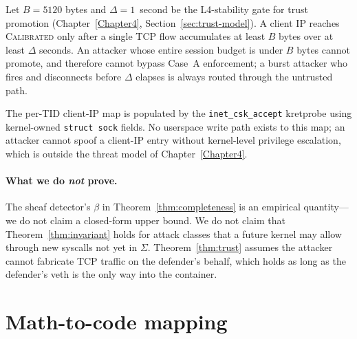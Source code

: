 \begin{theorem}\label{thm:trust}
Let $B = 5120$ bytes and $\Delta = 1$~second be the L4-stability gate for
trust promotion (Chapter~\ref{Chapter4}, Section~\ref{sec:trust-model}). A
client IP reaches \textsc{Calibrated} only after a single TCP flow
accumulates at least $B$ bytes over at least $\Delta$ seconds. An attacker
whose entire session budget is under $B$ bytes cannot promote, and
therefore cannot bypass Case~A enforcement; a burst attacker who fires and
disconnects before $\Delta$ elapses is always routed through the
untrusted path.
\end{theorem}

\begin{remark}\label{rem:attribution}
The per-TID client-IP map is populated by the \texttt{inet\_csk\_accept}
kretprobe using kernel-owned \texttt{struct sock} fields. No userspace
write path exists to this map; an attacker cannot spoof a client-IP entry
without kernel-level privilege escalation, which is outside the threat
model of Chapter~\ref{Chapter4}.
\end{remark}

\paragraph{What we do \emph{not} prove.}  The sheaf detector's
$\beta$ in Theorem~\ref{thm:completeness} is an empirical quantity---we do
not claim a closed-form upper bound. We do not claim that
Theorem~\ref{thm:invariant} holds for attack classes that a future kernel
may allow through new syscalls not yet in $\Sigma$. Theorem~\ref{thm:trust}
assumes the attacker cannot fabricate TCP traffic on the defender's behalf,
which holds as long as the defender's veth is the only way into the
container.

\section{Math-to-code mapping}
\label{sec:math-map}

